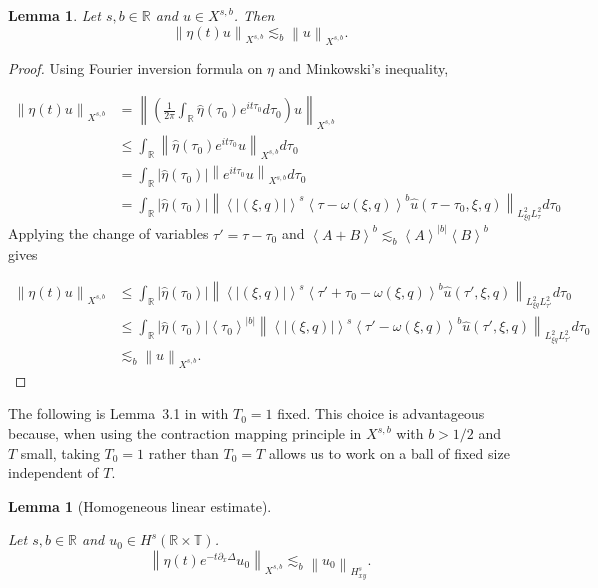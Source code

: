 \documentclass[12pt,oneside,reqno]{amsart}
\numberwithin{equation}{section}
\theoremstyle{plain}
\newtheorem{lemma}[theorem]{Lemma}
\def\R{{\mathbb R}}
\def\T{{\mathbb T}}
\newcommand{\abs}[1]{%
    \left|#1\right|%
}
\newcommand{\norm}[1]{%
    \left\lVert #1\right\rVert%
}
\newcommand{\inp}[1]{%
    \left\langle #1\right\rangle
}
\newcommand{\prc}[1]{%
    \left(#1\right)
}
\def\pt{\partial}
\newcommand{\Hnxy}[3]{%
    \left\lVert #1\right\rVert_{H^{#2}_{#3}}%
}
\newcommand{\xnorm}[3]{%
    \left\lVert #1\right\rVert_{X^{{#2},{#3}}}%
}
\newcommand{\Fh}[1]{\widehat{#1}}
\begin{document}
\begin{lemma}
\label{Lem:XsbStability}
Let $s,b\in\R$ and $u\in X^{s,b}$. Then
$$\xnorm{\eta(t) u}{s}{b} \lesssim_{b} \xnorm{u}{s}{b}.$$
\end{lemma}

\begin{proof}
    Using Fourier inversion formula on $\eta$ and Minkowski's inequality, 

    \begin{align*}
        \xnorm{\eta(t) u}{s}{b} &= \xnorm{\prc{\frac{1}{2\pi}\int_\R \Fh{\eta} (\tau_0) e^{i t \tau_0 } d\tau_0 }u}{s}{b}\\
        & \le \int_\R \xnorm{\Fh{\eta}(\tau_0)e^{i t \tau_0} u}{s}{b} d\tau_0 \\
        &= \int_\R \abs{\Fh{\eta}(\tau_0)} \xnorm{e^{i t \tau_0} u}{s}{b} d \tau_0\\
        & = \int_\R \abs{\Fh{\eta}(\tau_0)} \norm{\inp{|(\xi,q)|}^s \inp{\tau - \omega(\xi,q)}^b \Fh{u}(\tau - \tau_0,\xi,q)}_{L^2_{\xi q} L^2_\tau} d\tau_0
    \end{align*}
Applying the change of variables $\tau' = \tau -\tau_0$ and $\inp{A+B}^b \lesssim_b \inp{A}^{|b|}\inp{B}^b$ gives 

\begin{align*}
    \xnorm{\eta(t) u}{s}{b} & \leq \int_\R \abs{\Fh{\eta}(\tau_0)} \norm{\inp{|(\xi,q)|}^s \inp{\tau'+\tau_0 - \omega(\xi,q)}^b \Fh{u}(\tau',\xi,q)}_{L^2_{\xi q} L^2_{\tau'}} d\tau_0\\
    & \le \int_\R \abs{\Fh{\eta}(\tau_0)} \inp{\tau_0}^{|b|} \norm{\inp{|(\xi,q)|}^s \inp{\tau' - \omega(\xi,q)}^b \Fh{u}(\tau',\xi,q)}_{L^2_{\xi q} L_{\tau'}^2} d\tau_0\\
    & \lesssim_b \xnorm{u}{s}{b}.
\end{align*}




    
\end{proof}

The following is Lemma~3.1 in \cite{ginibre1995probleme} with $T_0=1$ fixed. This choice is advantageous because, when using the contraction mapping principle in $X^{s,b}$ with $b>1/2$ and $T$ small, taking $T_0=1$ rather than $T_0=T$ allows us to work on a ball of fixed size independent of $T$.


\begin{lemma}[Homogeneous linear estimate] 
\label{Lem:homogeneous-linear-estimate}

Let $s,b\in\R$ and $u_0\in H^s(\R\times\T)$.
\begin{equation}
\label{lem:homogeneous-linear-estimate}
\xnorm{{\eta(t) e^{-t\pt_x\Delta}u_0}}{s}{b} \lesssim_b \Hnxy{u_0}{s}{xy}.
\end{equation}
\end{lemma}
\end{document}
